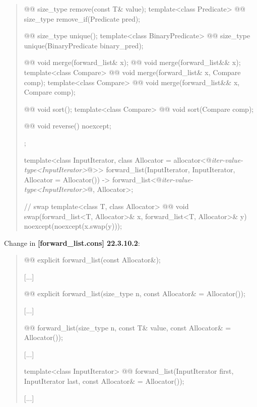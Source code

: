 \documentclass{wg21}
\begin{document}
\begin{quote}
\begin{codeblock}
{{    @@ size_type remove(const T& value);
    template<class Predicate> @@ size_type remove_if(Predicate pred);
    
    @@ size_type unique();
    template<class BinaryPredicate>
    @@ size_type unique(BinaryPredicate binary_pred);
    
    @@ void merge(forward_list& x);
    @@ void merge(forward_list&& x);
    template<class Compare> @@ void merge(forward_list& x, Compare comp);
    template<class Compare> @@ void merge(forward_list&& x, Compare comp);
    
    @@ void sort();
    template<class Compare> @@ void sort(Compare comp);
    
    @@ void reverse() noexcept;
  };

  template<class InputIterator,
           class Allocator = allocator<@\textit{iter-value-type<InputIterator>}@>>
    forward_list(InputIterator, InputIterator, Allocator = Allocator())
      -> forward_list<@\textit{iter-value-type<InputIterator>}@, Allocator>;

  // swap
  template<class T, class Allocator>
    @@ void swap(forward_list<T, Allocator>& x, forward_list<T, Allocator>& y)
      noexcept(noexcept(x.swap(y)));
}
\end{codeblock}%
\end{quote}

Change in \textbf{[forward_list.cons] 22.3.10.2}:
\begin{quote}
\begin{itemdecl}
@@ explicit forward_list(const Allocator&);
\end{itemdecl}
[...]
\begin{itemdecl}
@@ explicit forward_list(size_type n, const Allocator& = Allocator());
\end{itemdecl}
[...]
\begin{itemdecl}
@@ forward_list(size_type n, const T& value, const Allocator& = Allocator());
\end{itemdecl}
[...]
\begin{itemdecl}
template<class InputIterator>
  @@ forward_list(InputIterator first, InputIterator last,
                             const Allocator& = Allocator());
\end{itemdecl}
[...]
\end{quote}
\end{document}
